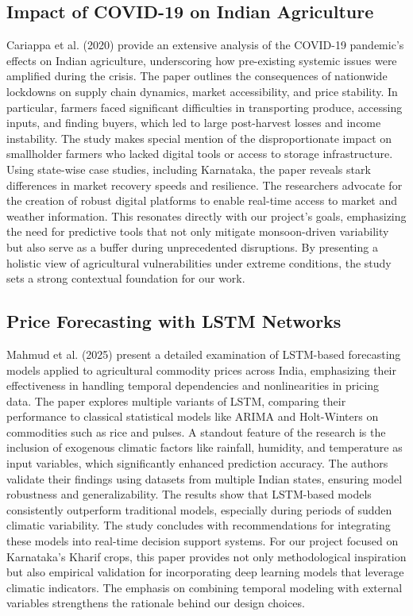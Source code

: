 \subsection{Impact of COVID-19 on Indian Agriculture \cite{cariappa2020impact}}
Cariappa et al. (2020) provide an extensive analysis of the COVID-19 pandemic's effects on Indian agriculture, underscoring how pre-existing systemic issues were amplified during the crisis. The paper outlines the consequences of nationwide lockdowns on supply chain dynamics, market accessibility, and price stability. In particular, farmers faced significant difficulties in transporting produce, accessing inputs, and finding buyers, which led to large post-harvest losses and income instability. The study makes special mention of the disproportionate impact on smallholder farmers who lacked digital tools or access to storage infrastructure. Using state-wise case studies, including Karnataka, the paper reveals stark differences in market recovery speeds and resilience. The researchers advocate for the creation of robust digital platforms to enable real-time access to market and weather information. This resonates directly with our project's goals, emphasizing the need for predictive tools that not only mitigate monsoon-driven variability but also serve as a buffer during unprecedented disruptions. By presenting a holistic view of agricultural vulnerabilities under extreme conditions, the study sets a strong contextual foundation for our work.

\subsection{Price Forecasting with LSTM Networks \cite{mahmud2025price}}
Mahmud et al. (2025) present a detailed examination of LSTM-based forecasting models applied to agricultural commodity prices across India, emphasizing their effectiveness in handling temporal dependencies and nonlinearities in pricing data. The paper explores multiple variants of LSTM, comparing their performance to classical statistical models like ARIMA and Holt-Winters on commodities such as rice and pulses. A standout feature of the research is the inclusion of exogenous climatic factors like rainfall, humidity, and temperature as input variables, which significantly enhanced prediction accuracy. The authors validate their findings using datasets from multiple Indian states, ensuring model robustness and generalizability. The results show that LSTM-based models consistently outperform traditional models, especially during periods of sudden climatic variability. The study concludes with recommendations for integrating these models into real-time decision support systems. For our project focused on Karnataka's Kharif crops, this paper provides not only methodological inspiration but also empirical validation for incorporating deep learning models that leverage climatic indicators. The emphasis on combining temporal modeling with external variables strengthens the rationale behind our design choices.

